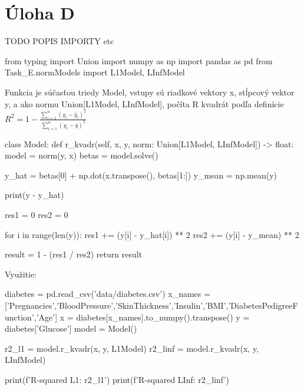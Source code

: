 \documentclass[12pt,oneside,a4paper,slovak]{article}
\begin{document}
   

\section*{Úloha D}
TODO POPIS IMPORTY etc
\begin{python}
from typing import Union
import numpy as np
import pandas as pd
from Task_E.normModels import L1Model, LInfModel
\end{python}
Funkcia je súčasťou triedy Model, vstupy sú riadkové vektory x, stĺpcový vektor y, a ako normu Union[L1Model, LInfModel], počíta R kvadrát podľa definície \begin{math}
R^2 = 1 - \frac{\sum_{i=1}^{n} (y_i - \hat{y}_i)^2}{\sum_{i=1}^{n} (y_i - \bar{y})^2}
\end{math}

\begin{python}
class Model:
    def r_kvadr(self, x, y, norm: Union[L1Model, LInfModel]) -> float:        
        model = norm(y, x)
        betas = model.solve()

        y_hat = betas[0] + np.dot(x.transpose(), betas[1:])
        y_mean = np.mean(y)

        print(y - y_hat)

        res1 = 0
        res2 = 0

        for i in range(len(y)):
            res1 += (y[i] - y_hat[i]) ** 2
            res2 += (y[i] - y_mean) ** 2

        result = 1 - (res1 / res2)
        return result
\end{python}
Využitie:
\begin{python}
diabetes = pd.read_csv('data/diabetes.csv')
x_names = ['Pregnancies','BloodPressure','SkinThickness','Insulin','BMI','DiabetesPedigreeFunction','Age']
x = diabetes[x_names].to_numpy().transpose()
y = diabetes['Glucose']
model = Model()

r2_l1 = model.r_kvadr(x, y, L1Model)
r2_linf = model.r_kvadr(x, y, LInfModel)

print(f'R-squared L1: {r2_l1}')
print(f'R-squared LInf: {r2_linf}')
\end{python}
\end{document}
